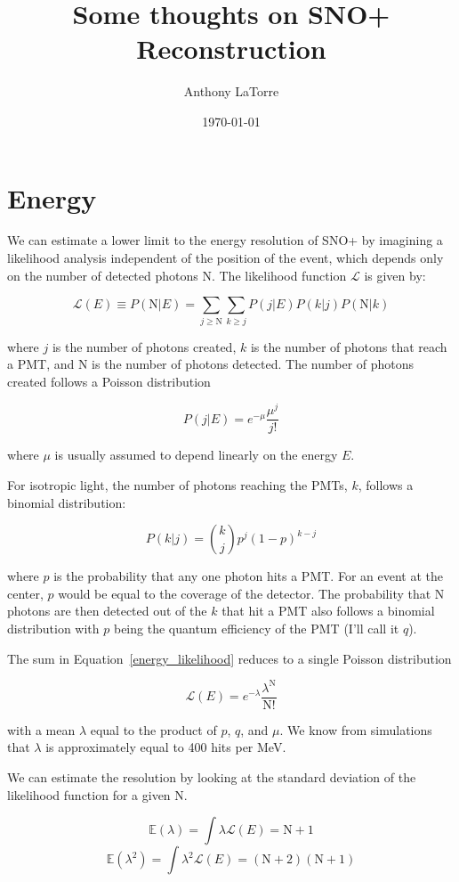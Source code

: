 \documentclass{article}
\author{Anthony LaTorre}
\date{\today}
\title{Some thoughts on SNO+ Reconstruction}
\newcommand{\like}{\mathscr{L}}
\newcommand{\N}{\mathrm{N}}
\begin{document}
\maketitle
\section{Energy}
We can estimate a lower limit to the energy resolution of SNO+ by imagining a
likelihood analysis independent of the position of the event, which depends
only on the number of detected photons $\N$. The likelihood function $\like$
is given by:

\begin{equation}
    \like(E) \equiv P(\N|E) = \sum_{j \geq \N} \sum_{k \geq j} P(j|E) P(k|j) P(\N|k)
    \label{energy_likelihood}
\end{equation}

where $j$ is the number of photons created, $k$ is the number of photons that
reach a PMT, and $\N$ is the number of photons detected. The number of photons
created follows a Poisson distribution

\[
    P(j|E) = e^{-\mu} \frac{\mu^j}{j!}
\]

where $\mu$ is usually assumed to depend linearly on the energy $E$.

For isotropic light, the number of photons reaching the PMTs, $k$, follows a
binomial distribution:

\[
    P(k|j) = \binom{k}{j} p^j (1-p)^{k-j}
\]

where $p$ is the probability that any one photon hits a PMT. For an event at
the center, $p$ would be equal to the coverage of the detector. The probability
that $\N$ photons are then detected out of the $k$ that hit a PMT also follows a
binomial distribution with $p$ being the quantum efficiency of the PMT (I'll
call it $q$).

The sum in Equation~\ref{energy_likelihood} reduces to a single Poisson distribution

\[
    \like(E) = e^{-\lambda} \frac{\lambda^\N}{\N!}
\]

with a mean $\lambda$ equal to the product of $p$, $q$, and $\mu$. We know from
simulations that $\lambda$ is approximately equal to 400 hits per MeV.

We can estimate the resolution by looking at the standard deviation of the
likelihood function for a given $\N$.

\[
    \mathbb{E}(\lambda) = \int \lambda \like(E) = \N+1
\]
\[
    \mathbb{E}(\lambda^2) = \int \lambda^2 \like(E) = (\N+2)(\N+1)
\]
\end{document}
